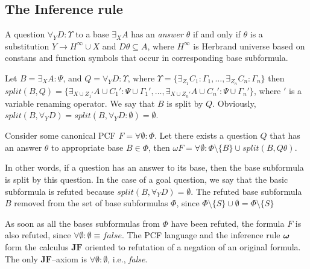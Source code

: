 \documentclass[runningheads,a4paper]{llncs}
\begin{document}
\subsection{The Inference rule}

\begin{definition}[Answer]
\label{answer}
A question $\forall_YD:\Upsilon$ to a base $\exists_XA$ has an {\em answer} $\theta$ if and only if $\theta$ is a substitution $Y \rightarrow H^{\infty} \cup X$ and $D\theta \subseteq A$, where $H^{\infty}$ is Herbrand universe based on constans and function symbols that occur in corresponding base subformula.
\end{definition}

\begin{definition}[Splitting]
\label{splitting}
Let $B = \exists_XA\colon\Psi$, and $Q = \forall_YD\colon\Upsilon$, where $\Upsilon = \{\exists_{Z_1}C_1\colon\Gamma_1,\ldots,\exists_{Z_n}C_n\colon\Gamma_n\}$ then $split(B,Q) = \{\exists_{X \cup {Z_1}'} A \cup {C_1}'\colon\Psi \cup {\Gamma_1}',\ldots,\exists_{X \cup {Z_n}'} A \cup {C_n}'\colon\Psi \cup {\Gamma_n}'\}$, where $'$ is a variable renaming operator. We say that $B$ is split by $Q$. Obviously, $split(B,\forall_YD) = split(B,\forall_YD\colon\emptyset) = \emptyset$.
\end{definition}

\begin{definition}
Consider some canonical PCF $F = \forall\emptyset\colon\Phi$. Let there exists a question $Q$ that has an answer $\theta$ to appropriate base $B \in \Phi$, then $\omega F  = \forall \emptyset\colon\Phi \setminus \{B\} \cup split(B,Q\theta)$.
\end{definition}

In other words, if a question has an answer to its base, then the base subformula is split by this question.  In the case of a goal question, we say that the basic subformula is refuted because $split(B,\forall_YD) = \emptyset$. The refuted base subformula $B$ removed from the set of base subformulas $\Phi$, since $\Phi \setminus \{S\} \cup \emptyset = \Phi \setminus \{S\}$

As soon as all the bases subformulas from $\Phi$ have been refuted, the formula $F$ is also refuted, since $\forall \emptyset\colon\emptyset \equiv false$.  The PCF language and the inference rule $\boldsymbol{\omega}$ form the calculus $\boldsymbol{JF}$ oriented to refutation of a negation of an original formula.  The only $\boldsymbol{JF}$--axiom is $\forall \emptyset\colon\emptyset$, i.e., \emph{false}.
\end{document}
